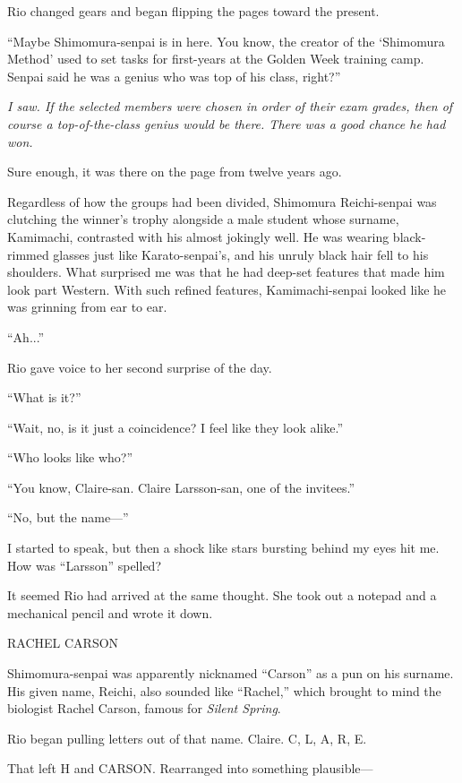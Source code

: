 \documentclass[
    a4paper,
    12pt,
    twoside,
    openany,
    UTF8,
    fontset=windows
]{ctexbook}
\begin{document}
Rio changed gears and began flipping the pages toward the present.

``Maybe Shimomura-senpai is in here. You know, the creator of the `Shimomura Method' used to set tasks for first-years at the Golden Week training camp. Senpai said he was a genius who was top of his class, right?''

\textit{I saw. If the selected members were chosen in order of their exam grades, then of course a top-of-the-class genius would be there. There was a good chance he had won.}

Sure enough, it was there on the page from twelve years ago.

Regardless of how the groups had been divided, Shimomura Reichi-senpai was clutching the winner's trophy alongside a male student whose surname, Kamimachi, contrasted with his almost jokingly well. He was wearing black-rimmed glasses just like Karato-senpai's, and his unruly black hair fell to his shoulders. What surprised me was that he had deep-set features that made him look part Western. With such refined features, Kamimachi-senpai looked like he was grinning from ear to ear.

``Ah...''

Rio gave voice to her second surprise of the day.

``What is it?''

``Wait, no, is it just a coincidence? I feel like they look alike.''

``Who looks like who?''

``You know, Claire-san. Claire Larsson-san, one of the invitees.''

``No, but the name---''

I started to speak, but then a shock like stars bursting behind my eyes hit me. How was ``Larsson'' spelled?

It seemed Rio had arrived at the same thought. She took out a notepad and a mechanical pencil and wrote it down.

\begin{center}
RACHEL CARSON
\end{center}

Shimomura-senpai was apparently nicknamed ``Carson'' as a pun on his surname. His given name, Reichi, also sounded like ``Rachel,'' which brought to mind the biologist Rachel Carson, famous for \textit{Silent Spring}.

Rio began pulling letters out of that name. Claire. C, L, A, R, E.

That left H and CARSON. Rearranged into something plausible---
\end{document}
